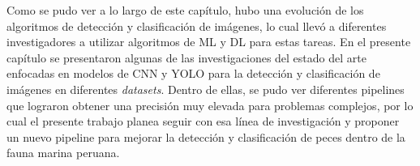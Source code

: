 Como se pudo ver a lo largo de este capítulo, hubo una evolución de los algoritmos de detección y clasificación de imágenes, lo cual llevó a diferentes investigadores a utilizar algoritmos de ML y DL para estas tareas. En el presente capítulo se presentaron algunas de las investigaciones del estado del arte enfocadas en modelos de CNN y YOLO para la detección y clasificación de imágenes en diferentes \textit{datasets}. Dentro de ellas, se pudo ver diferentes pipelines que lograron obtener una precisión muy elevada para problemas complejos, por lo cual el presente trabajo planea seguir con esa línea de investigación y proponer un nuevo pipeline para mejorar la detección y clasificación de peces dentro de la fauna marina peruana.   

